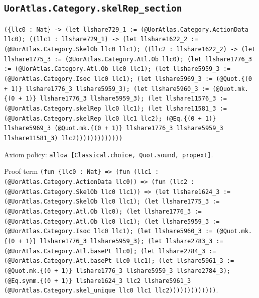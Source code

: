 \documentclass[11pt]{article}
\begin{document}
\subsection*{\texttt{UorAtlas.Category.skelRep\_section}}
\noindent\texttt{(\{llc0 : Nat\} -> (let llshare729\_1 := (@UorAtlas.Category.ActionData llc0); ((llc1 : llshare729\_1) -> (let llshare1622\_2 := (@UorAtlas.Category.SkelOb llc0 llc1); ((llc2 : llshare1622\_2) -> (let llshare1775\_3 := (@UorAtlas.Category.Atl.Ob llc0); (let llshare1776\_3 := (@UorAtlas.Category.Atl.Ob llc0 llc1); (let llshare5959\_3 := (@UorAtlas.Category.Isoc llc0 llc1); (let llshare5969\_3 := (@Quot.\{(0 + 1)\} llshare1776\_3 llshare5959\_3); (let llshare5960\_3 := (@Quot.mk.\{(0 + 1)\} llshare1776\_3 llshare5959\_3); (let llshare11576\_3 := (@UorAtlas.Category.skelRep llc0 llc1); (let llshare11581\_3 := (@UorAtlas.Category.skelRep llc0 llc1 llc2); (@Eq.\{(0 + 1)\} llshare5969\_3 (@Quot.mk.\{(0 + 1)\} llshare1776\_3 llshare5959\_3 llshare11581\_3) llc2)))))))))))))}\par
\noindent Axiom policy: \texttt{allow [Classical.choice, Quot.sound, propext]}.\par
\noindent Proof term \texttt{(fun \{llc0 : Nat\} => (fun (llc1 : (@UorAtlas.Category.ActionData llc0)) => (fun (llc2 : (@UorAtlas.Category.SkelOb llc0 llc1)) => (let llshare1624\_3 := (@UorAtlas.Category.SkelOb llc0 llc1); (let llshare1775\_3 := (@UorAtlas.Category.Atl.Ob llc0); (let llshare1776\_3 := (@UorAtlas.Category.Atl.Ob llc0 llc1); (let llshare5959\_3 := (@UorAtlas.Category.Isoc llc0 llc1); (let llshare5960\_3 := (@Quot.mk.\{(0 + 1)\} llshare1776\_3 llshare5959\_3); (let llshare2783\_3 := (@UorAtlas.Category.Atl.basePt llc0); (let llshare2784\_3 := (@UorAtlas.Category.Atl.basePt llc0 llc1); (let llshare5961\_3 := (@Quot.mk.\{(0 + 1)\} llshare1776\_3 llshare5959\_3 llshare2784\_3); (@Eq.symm.\{(0 + 1)\} llshare1624\_3 llc2 llshare5961\_3 (@UorAtlas.Category.skel\_unique llc0 llc1 llc2)))))))))))))}.\par
\end{document}
